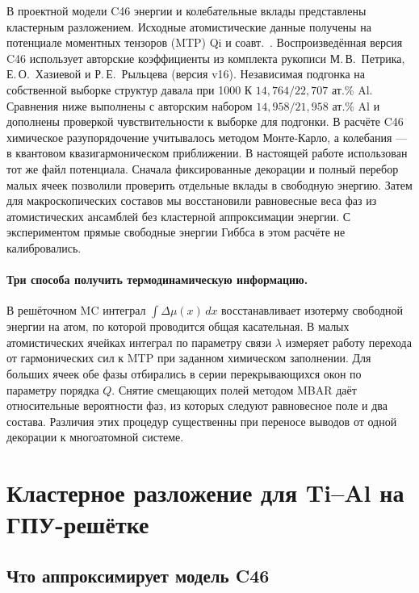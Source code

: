 \documentclass[11pt,a4paper]{article}
\begin{document}
В проектной модели C46 энергии и колебательные вклады представлены
кластерным разложением. Исходные атомистические данные получены на
потенциале моментных тензоров (MTP) Qi и соавт.~\cite{qi2023}.
Воспроизведённая версия C46 использует авторские коэффициенты из комплекта
рукописи М.\,В.~Петрика, Е.\,О.~Хазиевой и Р.\,Е.~Рыльцева (версия v16).
Независимая подгонка на собственной выборке структур давала
при 1000 К \(14{,}764/22{,}707\) ат.\% Al. Сравнения ниже выполнены с
авторским набором \(14{,}958/21{,}958\) ат.\% Al и дополнены проверкой
чувствительности к выборке для подгонки.
В расчёте C46 химическое разупорядочение учитывалось методом
Монте-Карло, а колебания — в квантовом квазигармоническом приближении.
В настоящей работе использован тот же файл потенциала. Сначала фиксированные
декорации и полный перебор малых ячеек позволили проверить отдельные
вклады в свободную энергию. Затем для макроскопических составов мы
восстановили равновесные веса фаз из атомистических ансамблей без
кластерной аппроксимации энергии. С экспериментом прямые свободные
энергии Гиббса в этом расчёте не калибровались.

\paragraph{Три способа получить термодинамическую информацию.}
В решёточном MC интеграл \(\int\Delta\mu(x)\,dx\) восстанавливает
изотерму свободной энергии на атом, по которой проводится общая касательная.
В малых атомистических ячейках интеграл по параметру связи \(\lambda\)
измеряет работу перехода от гармонических сил к MTP при заданном
химическом заполнении. Для больших ячеек обе фазы отбирались в серии
перекрывающихся окон по параметру порядка \(Q\). Снятие смещающих полей
методом MBAR даёт относительные вероятности фаз, из которых следуют
равновесное поле и два состава. Различия этих процедур существенны при
переносе выводов от одной декорации к многоатомной системе.

\section{Кластерное разложение для Ti--Al на ГПУ-решётке}
\label{sec:ce-model}

\subsection{Что аппроксимирует модель C46}
\end{document}
